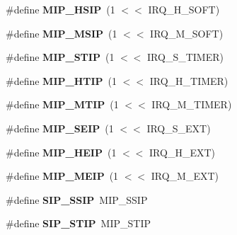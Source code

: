 \begin{DoxyCompactItemize}
\item 
\mbox{\label{riscv-utility_8h_ab8226593c790568a432eeb8ca7bb4270}} 
\#define {\bfseries M\+I\+P\+\_\+\+H\+S\+IP}~(1 $<$$<$ I\+R\+Q\+\_\+\+H\+\_\+\+S\+O\+FT)
\item 
\mbox{\label{riscv-utility_8h_a09c2dda94121d966560ac22fe6becdb3}} 
\#define {\bfseries M\+I\+P\+\_\+\+M\+S\+IP}~(1 $<$$<$ I\+R\+Q\+\_\+\+M\+\_\+\+S\+O\+FT)
\item 
\mbox{\label{riscv-utility_8h_a40a54377f1fdb317c3f7397043874cae}} 
\#define {\bfseries M\+I\+P\+\_\+\+S\+T\+IP}~(1 $<$$<$ I\+R\+Q\+\_\+\+S\+\_\+\+T\+I\+M\+ER)
\item 
\mbox{\label{riscv-utility_8h_a15a22cfcd6f41aea04b9943a71d0a2ff}} 
\#define {\bfseries M\+I\+P\+\_\+\+H\+T\+IP}~(1 $<$$<$ I\+R\+Q\+\_\+\+H\+\_\+\+T\+I\+M\+ER)
\item 
\mbox{\label{riscv-utility_8h_a51c044e20264a9e2a875b17482e8ff11}} 
\#define {\bfseries M\+I\+P\+\_\+\+M\+T\+IP}~(1 $<$$<$ I\+R\+Q\+\_\+\+M\+\_\+\+T\+I\+M\+ER)
\item 
\mbox{\label{riscv-utility_8h_a3fdf03c28e7d1baba8fa6bb11eae8561}} 
\#define {\bfseries M\+I\+P\+\_\+\+S\+E\+IP}~(1 $<$$<$ I\+R\+Q\+\_\+\+S\+\_\+\+E\+XT)
\item 
\mbox{\label{riscv-utility_8h_a1c1ae7b718753753a5c99292450df837}} 
\#define {\bfseries M\+I\+P\+\_\+\+H\+E\+IP}~(1 $<$$<$ I\+R\+Q\+\_\+\+H\+\_\+\+E\+XT)
\item 
\mbox{\label{riscv-utility_8h_aa0b390526aa02e969ae64235b983069a}} 
\#define {\bfseries M\+I\+P\+\_\+\+M\+E\+IP}~(1 $<$$<$ I\+R\+Q\+\_\+\+M\+\_\+\+E\+XT)
\item 
\mbox{\label{riscv-utility_8h_acdfe2a4376d4c9873b865b878c6d5d2e}} 
\#define {\bfseries S\+I\+P\+\_\+\+S\+S\+IP}~M\+I\+P\+\_\+\+S\+S\+IP
\item 
\mbox{\label{riscv-utility_8h_aa32b89e7176c6d37caa3ad78a600f4a1}} 
\#define {\bfseries S\+I\+P\+\_\+\+S\+T\+IP}~M\+I\+P\+\_\+\+S\+T\+IP

\end{DoxyCompactItemize}
